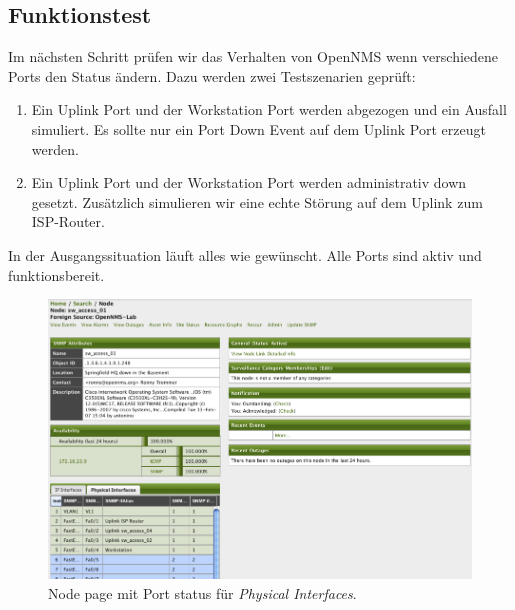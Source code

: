 \subsection{Funktionstest}
Im nächsten Schritt prüfen wir das Verhalten von OpenNMS wenn verschiedene Ports den Status ändern. Dazu werden zwei Testszenarien geprüft:
\begin{enumerate}
\item{Ein Uplink Port und der Workstation Port werden abgezogen und ein Ausfall simuliert. Es sollte nur ein Port Down Event auf dem Uplink Port erzeugt werden.}
\item{Ein Uplink Port und der Workstation Port werden administrativ down gesetzt. Zusätzlich simulieren wir eine echte Störung auf dem Uplink zum ISP-Router.}
\end{enumerate}
In der Ausgangssituation läuft alles wie gewünscht. Alle Ports sind aktiv und funktionsbereit.
\begin{figure}[H]
	\centering
	\includegraphics[width=1.0\textwidth]{images/use-cases/monitoring-layer-2/node-page-snmpifpoller}
	\caption{Node page mit Port status für \emph{Physical Interfaces}.}
	\label{pic:node-page-snmpifpoller}
\end{figure}

